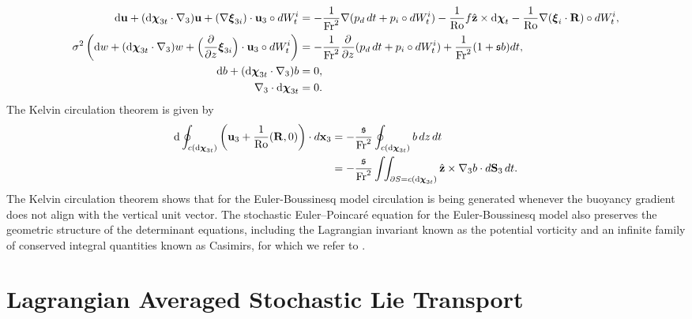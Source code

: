 \documentclass[11pt, oneside]{article}   	%
\numberwithin{equation}{section}
\theoremstyle{plain}
\theoremstyle{definition}
\theoremstyle{remark}
\newcommand{\<}{\langle}
\renewcommand{\>}{\rangle}
\def\rmd{{\mathrm{d}}}
\begin{document}
\begin{equation}
\begin{aligned}
{\rmd}\mathbf{u} + ({\rmd}\boldsymbol\chi_{3t}\cdot\nabla_3)\mathbf{u} + (\nabla\boldsymbol\xi_{3i})\cdot\mathbf{u}_3\circ dW_t^i &= -\frac{1}{{\rm Fr}^2}\nabla (p_d \,dt + p_i\circ dW_t^i) - \frac{1}{{\rm Ro}}f\hat{\mathbf{z}}\times{\rmd}\boldsymbol \chi_t - \frac{1}{{\rm Ro}}\nabla(\boldsymbol \xi_i\cdot\mathbf{R})\circ dW_t^i,\\
\sigma^2\left({\rmd}w +({\rmd}\boldsymbol\chi_{3t}\cdot\nabla_3)w + \Big(\frac{\partial}{\partial z}\boldsymbol\xi_{3i}\Big)\cdot\mathbf{u}_3\circ dW_t^i \right) &= -\frac{1}{{\rm Fr}^2}\frac{\partial}{\partial z}(p_d \,dt + p_i\circ dW_t^i) + \frac{1}{{\rm Fr}^2}(1+\mathfrak{s}b)dt,\\
{\rmd}b + ({\rmd}\boldsymbol \chi_{3t}\cdot\nabla_3)b &= 0,\\
\nabla_3\cdot{\rmd}\boldsymbol\chi_{3t} &= 0.
\end{aligned}
\end{equation}
The Kelvin circulation theorem is given by
\begin{equation}
\begin{aligned}
{\rmd}\oint_{c({\rmd}\boldsymbol \chi_{3t})}\left(\mathbf{u}_3 + \frac{1}{{\rm Ro}}(\mathbf{R},0)\right)\cdot d\mathbf{x}_3 &= -\frac{\mathfrak{s}}{{\rm Fr}^2}\oint_{c({\rmd}\boldsymbol \chi_{3t})} b\,dz\,dt\\
&= -\frac{\mathfrak{s}}{{\rm Fr}^2}\int\!\!\int_{\partial S = c({\rmd}\boldsymbol\chi_{3t})}\hat{\mathbf{z}}\times\nabla_3 b\cdot d\mathbf{S}_3\,dt.
\end{aligned}
\end{equation}
The Kelvin circulation theorem shows that for the Euler-Boussinesq model circulation is being generated whenever the buoyancy gradient does not align with the vertical unit vector. The stochastic Euler--Poincar\'e equation for the Euler-Boussinesq model also preserves the geometric structure of the determinant equations, including the Lagrangian invariant known as the potential vorticity and an infinite family of conserved integral quantities known as Casimirs, for which we refer to \cite{holm2021stochastic, luesink2021stochastic}. 


\newpage
\part{Lagrangian Averaged Stochastic Lie Transport}
\end{document}
